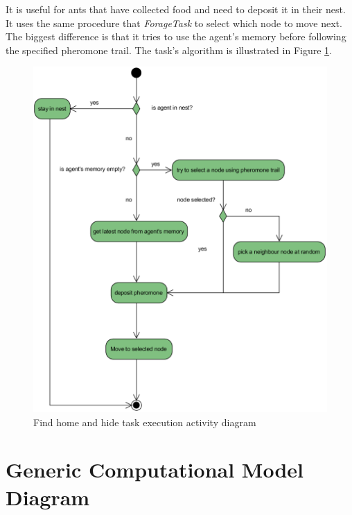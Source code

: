 It is useful for ants that have collected food and need to deposit it in their nest. It uses the same procedure that \emph{ForageTask} to select which node to move next. The biggest difference is that it tries to use the agent's memory before following the specified pheromone trail. The task's algorithm is illustrated in Figure \ref{fig:find-home-hide-act}.

\begin{figure}[H]
  \centering
  \includegraphics[width=0.8\linewidth]{gfx/uml-act-home-hide.png}
  \caption{Find home and hide task execution activity diagram}
  \label{fig:find-home-hide-act}
\end{figure}

\section {Generic Computational Model Diagram}


